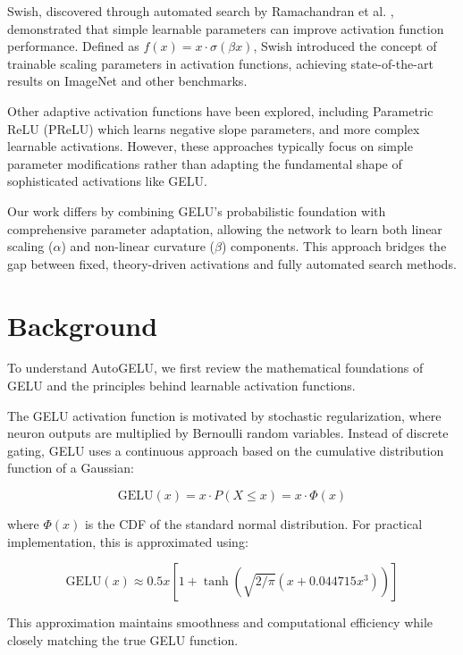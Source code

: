 \documentclass{article} %
\begin{document}
Swish, discovered through automated search by Ramachandran et al. \citep{ramachandran2017swish}, demonstrated that simple learnable parameters can improve activation function performance. Defined as $f(x) = x \cdot \sigma(\beta x)$, Swish introduced the concept of trainable scaling parameters in activation functions, achieving state-of-the-art results on ImageNet and other benchmarks.

Other adaptive activation functions have been explored, including Parametric ReLU (PReLU) \citep{he2015prelu} which learns negative slope parameters, and more complex learnable activations. However, these approaches typically focus on simple parameter modifications rather than adapting the fundamental shape of sophisticated activations like GELU.

Our work differs by combining GELU's probabilistic foundation with comprehensive parameter adaptation, allowing the network to learn both linear scaling ($\alpha$) and non-linear curvature ($\beta$) components. This approach bridges the gap between fixed, theory-driven activations and fully automated search methods.

\section{Background}

To understand AutoGELU, we first review the mathematical foundations of GELU and the principles behind learnable activation functions.

The GELU activation function is motivated by stochastic regularization, where neuron outputs are multiplied by Bernoulli random variables. Instead of discrete gating, GELU uses a continuous approach based on the cumulative distribution function of a Gaussian:

\begin{equation}
\text{GELU}(x) = x \cdot P(X \leq x) = x \cdot \Phi(x)
\end{equation}

where $\Phi(x)$ is the CDF of the standard normal distribution. For practical implementation, this is approximated using:

\begin{equation}
\text{GELU}(x) \approx 0.5x[1 + \tanh(\sqrt{2/\pi}(x + 0.044715x^3))]
\end{equation}

This approximation maintains smoothness and computational efficiency while closely matching the true GELU function.
\end{document}

